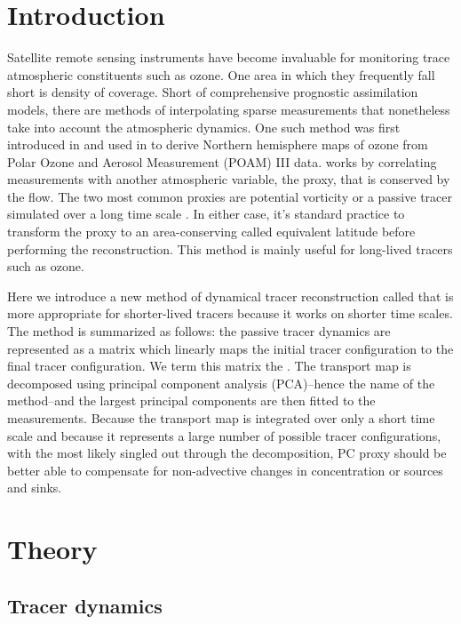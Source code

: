 
\section{Introduction}

Satellite remote sensing instruments have become invaluable for monitoring
trace atmospheric constituents such as ozone.
One area in which they frequently fall short is density of coverage.
Short of comprehensive prognostic assimilation models, there are methods of
interpolating sparse measurements that nonetheless take into account the
atmospheric dynamics.
One such method was first introduced in \citet{Butchart_Remsberg1986}
and used in \citet{Randall_etal2002} to derive Northern hemisphere maps
of ozone from Polar Ozone and Aerosol Measurement (POAM) III data.
 works by correlating
measurements with another atmospheric variable, the proxy, that 
is conserved by the flow.
The two most common proxies are potential vorticity \citep{Hoskins_etal1985} 
or a passive tracer simulated over a long time scale \citep{Allen_Nakamura2003}.
In either case, it's standard practice to transform the proxy to an
area-conserving  called equivalent latitude
before performing the reconstruction.
This method is mainly useful for long-lived tracers such as ozone.

Here we introduce a new method of dynamical tracer reconstruction
called  
that is more appropriate for shorter-lived tracers
because it works on shorter time scales.
The method is summarized as follows: 
the passive tracer dynamics are represented as a matrix
which linearly maps the initial tracer configuration
to the final tracer configuration.
We term this matrix the .
The transport map is decomposed using
principal component analysis (PCA)--hence the name of the method--and the largest principal components are then fitted to the measurements.
Because the transport map is integrated over only a short time scale and 
because it represents a large number of possible tracer configurations, with the most
likely singled out through the decomposition, 
PC proxy should be better able to 
compensate for non-advective changes in concentration or sources
and sinks.

\section{Theory}

\subsection{Tracer dynamics}

